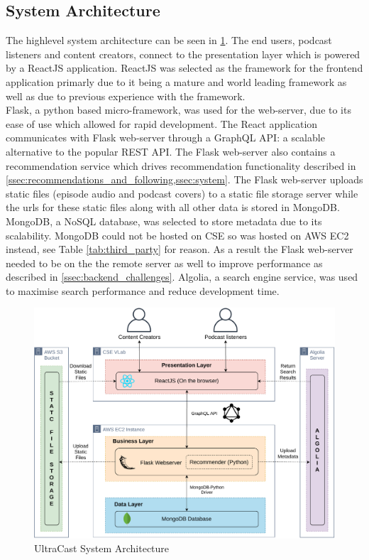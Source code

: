 \documentclass[../report.tex]{subfiles}
\begin{document}
\newpage

\subsection{System Architecture}

The highlevel system architecture can be seen in \cref{fig:system_architecture}.
The end users, podcast listeners and content creators, connect to the presentation layer 
which is powered by a ReactJS application. ReactJS was selected as the framework for the 
frontend application primarly due to it being a mature and world leading framework\cite{react} as well
as due to previous experience with the framework.\\

Flask, a python based micro-framework\cite{flask}, was used for the web-server, due to its ease of use which allowed
for rapid development. The React application communicates with Flask web-server through a GraphQL API: 
a scalable alternative to the popular REST API\cite{graphql}. The Flask web-server also contains a
recommendation service which drives recommendation functionality described in 
\cref{ssec:recommendations_and_following,ssec:system}. The Flask web-server uploads static files 
(episode audio and podcast covers) to a static file storage server while
the urls for these static files along with all other data is stored in MongoDB. MongoDB, a NoSQL database, 
was selected to store metadata due to its scalability\cite{MongoDB2020}. MongoDB could not be hosted on
CSE so was hosted on AWS EC2 instead, see Table \ref{tab:third_party} for reason. As a result the Flask web-server
needed to be on the the remote server as well to improve performance as described in \cref{ssec:backend_challenges}.
Algolia, a search engine service\cite{algolia}, was used to maximise search performance and reduce development time.

\begin{figure}[ht] 
    \centering
    \includegraphics[width=16cm]{resources/SystemArchitecture}
    \caption{UltraCast System Architecture}
    \label{fig:system_architecture} 
\end{figure}
\end{document}
